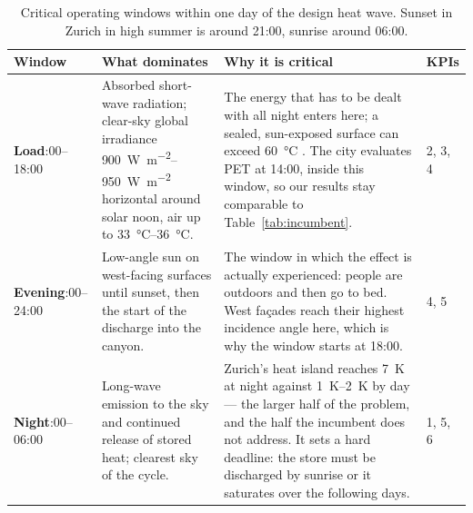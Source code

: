 \begin{table}[htbp]
\centering
\caption{Critical operating windows within one day of the design heat wave.
Sunset in Zurich in high summer is around 21:00, sunrise around 06:00.}
\label{tab:windows}
\renewcommand{\arraystretch}{1.2}
\small
\begin{tabularx}{\textwidth}{L{2.2cm} L{3.6cm} X L{1.3cm}}
\toprule
\textbf{Window} & \textbf{What dominates} & \textbf{Why it is critical} & \textbf{KPIs} \\
\midrule
\textbf{Load}:00--18:00
& Absorbed short-wave radiation; clear-sky global irradiance
  \qtyrange{900}{950}{\watt\per\square\metre} horizontal around solar noon,
  air up to \qtyrange{33}{36}{\celsius}.
& The energy that has to be dealt with all night enters here; a sealed,
  sun-exposed surface can exceed \qty{60}{\celsius}
  \parencite{stadtzuerich_merkblatt}. The city evaluates PET at 14:00, inside
  this window, so our results stay comparable to Table~\ref{tab:incumbent}.
& 2, 3, 4 \\[1mm]
\textbf{Evening}:00--24:00
& Low-angle sun on west-facing surfaces until sunset, then the start of the
  discharge into the canyon.
& The window in which the effect is actually experienced: people are outdoors
  and then go to bed. West façades reach their highest incidence angle here,
  which is why the window starts at 18:00.
& 4, 5 \\[1mm]
\textbf{Night}:00--06:00
& Long-wave emission to the sky and continued release of stored heat; clearest
  sky of the cycle.
& Zurich's heat island reaches \qty{7}{\kelvin} at night against
  \qtyrange{1}{2}{\kelvin} by day \parencite{stadtzuerich_merkblatt} --- the
  larger half of the problem, and the half the incumbent does not address. It
  sets a hard deadline: the store must be discharged by sunrise or it saturates
  over the following days.
& 1, 5, 6 \\
\bottomrule
\end{tabularx}
\end{table}

